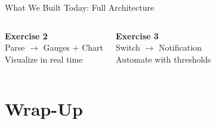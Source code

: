 \documentclass[aspectratio=169,11pt]{beamer}
\begin{document}
\begin{frame}[shrink=15]{What We Built Today: Full Architecture}
\begin{columns}
        \centering
        \textbf{Exercise 2}\\
        {\small Parse $\rightarrow$ Gauges + Chart}\\
        {\tiny Visualize in real time}

        \centering
        \textbf{Exercise 3}\\
        {\small Switch $\rightarrow$ Notification}\\
        {\tiny Automate with thresholds}
    \end{columns}
\end{frame}

\section{Wrap-Up}
\end{document}
